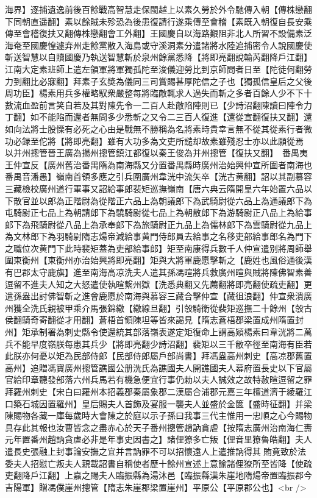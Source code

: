 海界】逐捕遺逸前後百餘戰高智慧走保閩越上以素久勞於外令馳傳入朝【傳株戀翻下同朝直遥翻】素以餘賊未殄恐為後患復請行遂乘傳至會稽【素既入朝復自長安乘傳至會稽復扶又翻傳株戀翻會工外翻】王國慶自以海路艱阻非北人所習不設備素泛海奄至國慶惶遽弃州走餘黨散入海島或守溪洞素分遣諸將水陸追捕密令人說國慶使斬送智慧以自贖國慶乃執送智慧斬於泉州餘黨悉降【將即亮翻說輸芮翻降戶江翻】江南大定素班師上遣左領軍將軍獨孤陀至浚儀迎勞比到京師問者日至【陀徒何翻勞力到翻比必寐翻】拜素子玄奬為儀同三司賞賜甚厚陀信之子也【獨孤信皇后之父後周功臣】楊素用兵多權略馭衆嚴整每將臨敵輒求人過失而斬之多者百餘人少不下十數流血盈前言笑自若及其對陳先令一二百人赴敵陷陣則已【少詩沼翻陳讀曰陣令力丁翻】如不能陷而還者無問多少悉斬之又令二三百人復進【還從宣翻復扶又翻】還如向法將士股慄有必死之心由是戰無不勝稱為名將素時貴幸言無不從其從素行者微功必録至佗將【將即亮翻】雖有大功多為文吏所譴却故素雖殘忍士亦以此願從焉　以并州摠管晉王廣為揚州摠管鎮江都復以秦王俊為并州摠管【復扶又翻】　番禺夷王仲宣反【廣州舊治番禺隋為南海縣又分置番禺縣時廣州治始興仲宣所圍者南海也番禺音潘愚】嶺南首領多應之引兵圍廣州韋洸中流矢卒【洸古黄翻】詔以其副慕容三藏檢校廣州道行軍事又詔給事郎裴矩巡撫嶺南【唐六典云隋開皇六年始置六品以下散官並以郎為正階尉為從階正六品上為朝議郎下為武騎尉從六品上為通議郎下為屯騎尉正七品上為朝請郎下為驍騎尉從七品上為朝散郎下為游騎尉正八品上為給事郎下為飛騎尉從八品上為承奉郎下為旅騎尉正九品上為儒林郎下為雲騎尉從九品上為文林郎下為羽騎尉隋志煬帝減給事黄門侍郎員去給事之名移吏部給事郎名為門下之職位次黄門下此時裴矩蓋為吏部給事郎】矩至南康得兵數千人仲宣遣别將周師舉圍東衡州【東衡州亦治始興將即亮翻】矩與大將軍鹿愿擊斬之【鹿姓也風俗通後漢有巴郡太守鹿旗】進至南海高凉洗夫人遣其孫馮暄將兵救廣州暄與賊將陳佛智素善逗留不進夫人知之大怒遣使執暄繫州獄【洗悉典翻又先薦翻將即亮翻使疏吏翻】更遣孫盎出討佛智斬之進會鹿愿於南海與慕容三藏合擊仲宣【藏徂浪翻】仲宣衆潰廣州獲全洗氏親被甲乘介馬張錦繖【繖線旦翻】引彀騎衛從裴矩巡撫二十餘州【彀古侯翻騎奇寄翻從才用翻】蒼梧首領陳坦等皆來謁見【隋志蒼梧郡梁置成州隋置封州】矩承制署為刺史縣令使還統其部落嶺表遂定矩復命上謂高熲楊素曰韋洸將二萬兵不能早度嶺朕每患其兵少【將即亮翻少詩沼翻】裴矩以三千敝卒徑至南海有臣若此朕亦何憂以矩為民部侍郎【民部侍郎屬戶部尚書】拜馮盎高州刺史【高凉郡舊置高州】追贈馮寶廣州摠管譙國公册洗氏為譙國夫人開譙國夫人幕府置長史以下官屬官給印章聽發部落六州兵馬若有機急便宜行事仍勅以夫人誠效之故特赦暄逗留之罪拜羅州刺史【宋白曰羅州本招義郡秦屬象郡二漢屬合浦郡元嘉三年檀道濟于綾羅江口築石城因置羅州】皇后賜夫人首飾及宴服一襲夫人並盛於金篋【盛時征翻】并梁陳賜物各藏一庫每歲時大會陳之於庭以示子孫曰我事三代主惟用一忠順之心今賜物具存此其報也汝曹皆念之盡赤心於天子番州摠管趙訥貪虐【按隋志廣州治南海仁夀元年置番州趙訥貪虐必非是年事史因書之】諸俚獠多亡叛【俚音里獠魯皓翻】夫人遣長史張融上封事論安撫之宜并言訥罪不可以招懷遠人上遣推訥得其賄竟致於法委夫人招慰亡叛夫人親載詔書自稱使者歷十餘州宣述上意諭諸俚獠所至皆降【使疏吏翻降戶江翻】上嘉之賜夫人臨振縣為湯沐邑【臨振縣漢朱崖地隋煬帝置臨振郡今吉陽軍】贈馮僕崖州摠管【隋志朱崖郡梁置崖州】平原公【平原郡公也】<br />
